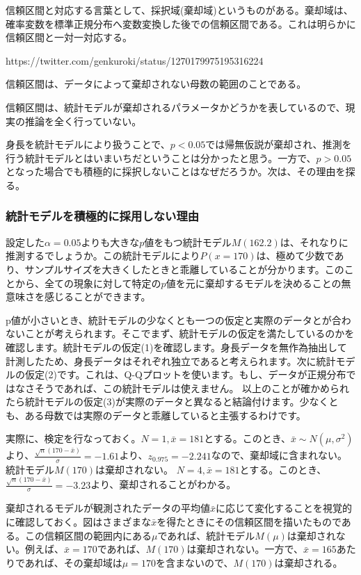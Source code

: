信頼区間と対応する言葉として、採択域(棄却域)というものがある。棄却域は、確率変数を標準正規分布へ変数変換した後での信頼区間である。これは明らかに信頼区間と一対一対応する。

https://twitter.com/genkuroki/status/1270179975195316224


信頼区間は、データによって棄却されない母数の範囲のことである。

信頼区間は、統計モデルが棄却されるパラメータかどうかを表しているので、現実の推論を全く行っていない。

身長を統計モデルにより扱うことで、$p<0.05$では帰無仮説が棄却され、推測を行う統計モデルとはいまいちだということは分かったと思う。一方で、$p>0.05$となった場合でも積極的に採択しないことはなぜだろうか。次は、その理由を探る。
\fi
\subsubsection{統計モデルを積極的に採用しない理由}
設定した$\alpha=0.05$よりも大きな$p$値をもつ統計モデル$M(162.2)$は、それなりに推測するでしょうか。この統計モデルにより$P(x=170)$は、極めて少数であり、サンプルサイズを大きくしたときと乖離していることが分かります。このことから、全ての現象に対して特定の$p$値を元に棄却するモデルを決めることの無意味さを感じることができます。

p値が小さいとき、統計モデルの少なくとも一つの仮定と実際のデータとが合わないことが考えられます。そこでまず、統計モデルの仮定を満たしているのかを確認します。統計モデルの仮定(1)を確認します。身長データを無作為抽出して計測したため、身長データはそれぞれ独立であると考えられます。次に統計モデルの仮定(2)です。これは、Q-Qプロットを使います。もし、データが正規分布ではなさそうであれば、この統計モデルは使えません。
以上のことが確かめられたら統計モデルの仮定(3)が実際のデータと異なると結論付けます。少なくとも、ある母数では実際のデータと乖離していると主張するわけです。



実際に、検定を行なっておく。$N=1,\bar{x}=181$とする。このとき、$\bar{x}\sim N(\mu,\sigma^2)$より、$\frac{\sqrt{n}(170-\bar{x})}{\sigma}=-1.61$より、$z_{0.975}=-2.241$なので、棄却域に含まれない。統計モデル$M(170)$は棄却されない。
$N=4,\bar{x}=181$とする。このとき、$\frac{\sqrt{n}(170-\bar{x})}{\sigma}=-3.23$より、棄却されることがわかる。

棄却されるモデルが観測されたデータの平均値$\bar{x}$に応じて変化することを視覚的に確認しておく。図はさまざまな$\bar{x}$を得たときにその信頼区間を描いたものである。この信頼区間の範囲内にある$\mu$であれば、統計モデル$M(\mu)$は棄却されない。例えば、$\bar{x}=170$であれば、$M(170)$は棄却されない。一方で、$\bar{x}=165$あたりであれば、その棄却域は$\mu=170$を含まないので、$M(170)$は棄却される。

